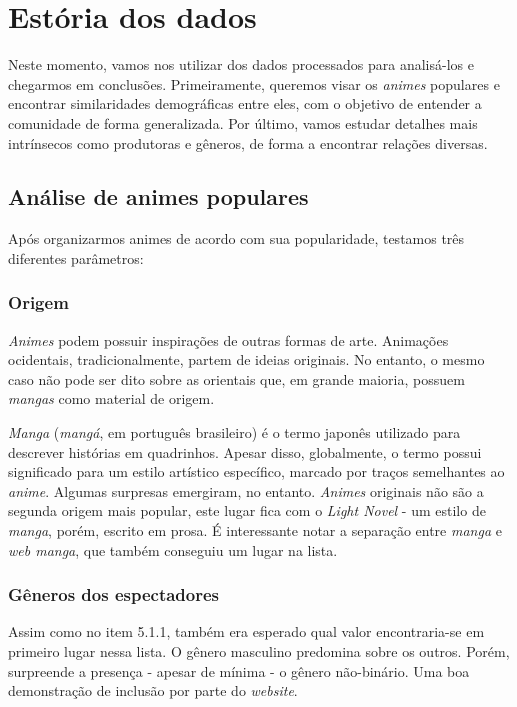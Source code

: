 \documentclass{article}
\begin{document}
\section{Estória dos dados}
\quad Neste momento, vamos nos utilizar dos dados processados para analisá-los e chegarmos em conclusões. Primeiramente, queremos visar os \textit{animes} populares e encontrar similaridades demográficas entre eles, com o objetivo de entender a comunidade de forma generalizada. Por último, vamos estudar detalhes mais intrínsecos como produtoras e gêneros, de forma a encontrar relações diversas.\par

\subsection{Análise de animes populares}
\quad Após organizarmos animes de acordo com sua popularidade, testamos três diferentes parâmetros:

\subsubsection{Origem}
\textit{Animes} podem possuir inspirações de outras formas de arte. Animações ocidentais, tradicionalmente, partem de ideias originais. No entanto, o mesmo caso não pode ser dito sobre as orientais que, em grande maioria, possuem \textit{mangas} como material de origem.\par

\textit{Manga}\cite{manga} (\textit{mangá}, em português brasileiro) é o termo japonês utilizado para descrever histórias em quadrinhos. Apesar disso, globalmente, o termo possui significado para um estilo artístico específico, marcado por traços semelhantes ao \textit{anime}.
Algumas surpresas emergiram, no entanto. \textit{Animes} originais não são a segunda origem mais popular, este lugar fica com o \textit{Light Novel} - um estilo de \textit{manga}, porém, escrito em prosa. É interessante notar a separação entre \textit{manga} e \textit{web manga}, que também conseguiu um lugar na lista.

\subsubsection{Gêneros dos espectadores}

\quad Assim como no item 5.1.1, também era esperado qual valor encontraria-se em primeiro lugar nessa lista. O gênero masculino predomina sobre os outros. Porém, surpreende a presença - apesar de mínima - o gênero não-binário. Uma boa demonstração de inclusão por parte do \textit{website}.
\end{document}
